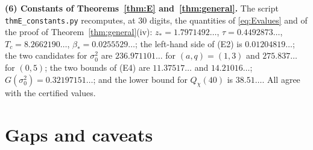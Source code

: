 \documentclass[11pt]{amsart}
\theoremstyle{definition}
\numberwithin{equation}{section}
\begin{document}
\medskip\noindent\textbf{(6) Constants of Theorems~\ref{thm:E}
and~\ref{thm:general}.} The script \texttt{thmE\_constants.py}
recomputes, at $30$ digits, the quantities of \eqref{eq:Evalues} and
of the proof of Theorem~\ref{thm:general}(iv):
$z_*=1.7971492\ldots$, $\tau=0.4492873\ldots$,
$T_c=8.2662190\ldots$, $\beta_*=0.0255529\ldots$; the left-hand side
of (E2) is $0.01204819\ldots$; the two candidates for $\sigma_0^2$ are
$236.971101\ldots$ for $(a,q)=(1,3)$ and $275.837\ldots$ for $(0,5)$;
the two bounds of (E4) are $11.37517\ldots$ and $14.21016\ldots$;
$G(\sigma_0^2)=0.32197151\ldots$; and the lower bound for
$Q_\chi(40)$ is $38.51\ldots$. All agree with the certified values.

\section{Gaps and caveats}\label{sec:gaps}
\end{document}
